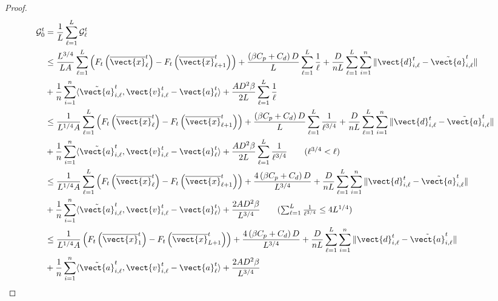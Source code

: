 \begin{proof}
\begin{align*}
        \mathcal{G}^t_{0}
        &= \frac{1}{L} \sum_{\ell=1}^{L}\mathcal{G}^{t}_{\ell}\\
        & \leq \frac{L^{3/4}}{LA} \sum_{\ell=1}^{L} \left(F_t \left( \overline{\vect{x}}^t_{\ell} \right) - F_t \left( \overline{\vect{x}}^t_{\ell+1} \right) \right) + \frac{\left(\beta C_p + C_d\right)D}{L} \sum_{\ell =1}^{L} \frac{1}{\ell} + \frac{D}{nL} \sum_{\ell=1}^{L} \sum_{i=1}^{n} \| \vect{d}^t_{i,\ell} - \Tilde{\vect{a}}^{t}_{i, \ell} \|\\
        &+ \frac{1}{n}\sum_{i=1}^{n}\langle \Tilde{\vect{a}}^{t}_{i, \ell}, \vect{v}^t_{i,\ell} - \vect{a}^{t}_{\ell} \rangle + \frac{AD^2\beta}{2L} \sum_{\ell =1}^{L} \frac{1}{\ell}\\
        & \leq \frac{1}{L^{1/4}A} \sum_{\ell=1}^{L} \left(F_t \left( \overline{\vect{x}}^t_{\ell} \right) - F_t \left( \overline{\vect{x}}^t_{\ell+1} \right) \right) + \frac{\left(\beta C_p + C_d\right)D}{L} \sum_{\ell =1}^{L} \frac{1}{\ell^{3/4}} + \frac{D}{nL} \sum_{\ell=1}^{L} \sum_{i=1}^{n} \| \vect{d}^t_{i,\ell} - \Tilde{\vect{a}}^{t}_{i, \ell} \| \\
        &+ \frac{1}{n}\sum_{i=1}^{n}\langle \Tilde{\vect{a}}^{t}_{i, \ell}, \vect{v}^t_{i,\ell} - \vect{a}^{t}_{\ell} \rangle + \frac{AD^2\beta}{2L} \sum_{\ell =1}^{L} \frac{1}{\ell^{3/4}} \tag{$\ell^{3/4} < \ell $}\\
        &\leq \frac{1}{L^{1/4}A} \sum_{\ell=1}^{L} \left(F_t \left( \overline{\vect{x}}^t_{\ell} \right) - F_t \left( \overline{\vect{x}}^t_{\ell+1} \right) \right) + \frac{4\left(\beta C_p + C_d\right)D}{L^{3/4}} + \frac{D}{nL} \sum_{\ell=1}^{L} \sum_{i=1}^{n} \| \vect{d}^t_{i,\ell} - \Tilde{\vect{a}}^{t}_{i, \ell} \| \\
        &+ \frac{1}{n}\sum_{i=1}^{n}\langle \Tilde{\vect{a}}^{t}_{i, \ell}, \vect{v}^t_{i,\ell} - \vect{a}^{t}_{\ell} \rangle + \frac{2AD^2\beta}{L^{3/4}}  \tag{$\sum_{\ell =1}^{L} \frac{1}{\ell^{3/4}} \leq 4L^{1/4} $}\\
         &\leq \frac{1}{L^{1/4}A} \left(F_t \left( \overline{\vect{x}}^t_{1} \right) - F_t \left( \overline{\vect{x}}^t_{L+1} \right) \right) + \frac{4\left(\beta C_p + C_d\right)D}{L^{3/4}} + \frac{D}{nL} \sum_{\ell=1}^{L} \sum_{i=1}^{n} \| \vect{d}^t_{i,\ell} - \Tilde{\vect{a}}^{t}_{i, \ell} \| \\
         &+ \frac{1}{n}\sum_{i=1}^{n}\langle \Tilde{\vect{a}}^{t}_{i, \ell}, \vect{v}^t_{i,\ell} - \vect{a}^{t}_{\ell} \rangle + \frac{2AD^2\beta}{L^{3/4}}

\end{align*}
\end{proof}

